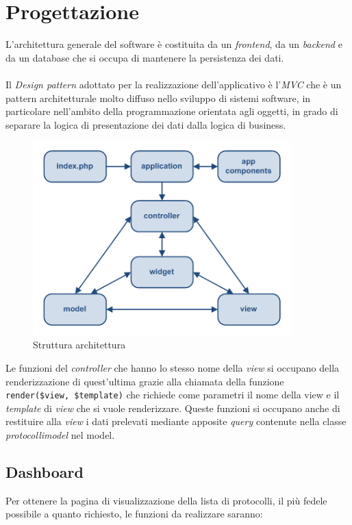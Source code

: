 \section{Progettazione}
\label{sec:progettazione}
    L’architettura generale del software è costituita da un \emph{\textit{frontend}\glsfirstoccur}, da un \emph{\textit{backend}\glsfirstoccur} e da un database che si occupa di mantenere la persistenza dei dati.
    \\
    \\
    Il \emph{\textit{Design pattern}\glsfirstoccur} adottato per la realizzazione dell'applicativo è l'\emph{\textit{MVC}\glsfirstoccur} che è un pattern architetturale molto diffuso nello sviluppo di sistemi software, in particolare nell'ambito della programmazione orientata agli oggetti, in grado di separare la logica di presentazione dei dati dalla logica di business.
    \begin{figure}[!h] 
        \centering 
        \includegraphics[width=10cm]{immagini/structure.png}
        \caption{Struttura architettura}
    \end{figure}
    \newpage
    Le funzioni del \textit{controller} che hanno lo stesso nome della \textit{view} si occupano della renderizzazione di quest'ultima grazie alla chiamata della funzione \texttt{render(\$view, \$template)} che richiede come parametri il nome della view e il \textit{template} di \textit{view} che si vuole renderizzare. Queste funzioni si occupano anche di restituire alla \textit{view} i dati prelevati mediante apposite \textit{query} contenute nella classe \textit{protocollimodel} nel model.
    
    \subsection{Dashboard}
    Per ottenere la pagina di visualizzazione della lista di protocolli, il più fedele possibile a quanto richiesto, le funzioni da realizzare saranno:
    

